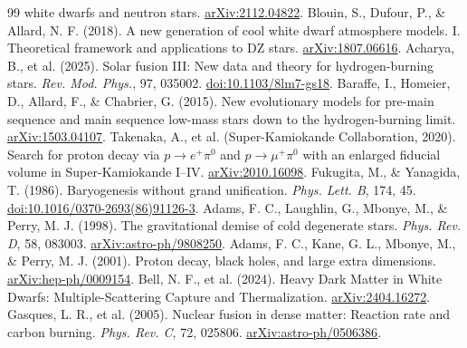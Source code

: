 \documentclass[11pt,letterpaper]{article}
\begin{document}
\begin{thebibliography}{99}
white dwarfs and neutron stars.
\href{https://arxiv.org/abs/2112.04822}{arXiv:2112.04822}.
 Blouin, S., Dufour, P., \& Allard, N. F. (2018).
A new generation of cool white dwarf atmosphere models. I. Theoretical framework
and applications to DZ stars.
\href{https://arxiv.org/abs/1807.06616}{arXiv:1807.06616}.
 Acharya, B., et al. (2025).
Solar fusion III: New data and theory for hydrogen-burning stars.
\emph{Rev. Mod. Phys.}, 97, 035002.
\href{https://doi.org/10.1103/8lm7-gs18}{doi:10.1103/8lm7-gs18}.
 Baraffe, I., Homeier, D., Allard, F., \& Chabrier, G. (2015).
New evolutionary models for pre-main sequence and main sequence low-mass stars
down to the hydrogen-burning limit.
\href{https://arxiv.org/abs/1503.04107}{arXiv:1503.04107}.
 Takenaka, A., et al. (Super-Kamiokande Collaboration, 2020).
Search for proton decay via $p\to e^+\pi^0$ and $p\to\mu^+\pi^0$
with an enlarged fiducial volume in Super-Kamiokande I--IV.
\href{https://arxiv.org/abs/2010.16098}{arXiv:2010.16098}.
 Fukugita, M., \& Yanagida, T. (1986).
Baryogenesis without grand unification. \emph{Phys. Lett. B}, 174, 45.
\href{https://doi.org/10.1016/0370-2693(86)91126-3}{doi:10.1016/0370-2693(86)91126-3}.
 Adams, F. C., Laughlin, G., Mbonye, M., \& Perry, M. J. (1998).
The gravitational demise of cold degenerate stars. \emph{Phys. Rev. D}, 58, 083003.
\href{https://arxiv.org/abs/astro-ph/9808250}{arXiv:astro-ph/9808250}.
 Adams, F. C., Kane, G. L., Mbonye, M., \& Perry, M. J. (2001).
Proton decay, black holes, and large extra dimensions.
\href{https://arxiv.org/abs/hep-ph/0009154}{arXiv:hep-ph/0009154}.
 Bell, N. F., et al. (2024).
Heavy Dark Matter in White Dwarfs: Multiple-Scattering Capture and Thermalization.
\href{https://arxiv.org/abs/2404.16272}{arXiv:2404.16272}.
 Gasques, L. R., et al. (2005).
Nuclear fusion in dense matter: Reaction rate and carbon burning.
\emph{Phys. Rev. C}, 72, 025806.
\href{https://arxiv.org/abs/astro-ph/0506386}{arXiv:astro-ph/0506386}.
\end{thebibliography}

\end{document}
